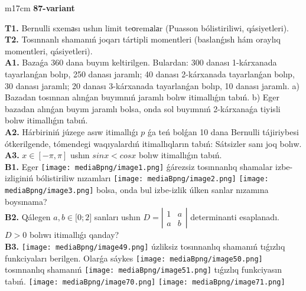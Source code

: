 \documentclass{article}
\begin{document}
\begin{tabular}{m{17cm}}
\textbf{87-variant}
\newline

\textbf{T1.} Bernulli sxemаsı ushın limit teоremаlаr (Puasson bólistiriliwi, qásiyetleri).
 \\
\textbf{T2.} Tosınnanlı shamanıń joqarı tártipli momentleri (baslanǵısh hám oraylıq momentleri, qásiyetleri).
 \\
\textbf{A1.} Bazaǵa 360 dana buyım keltirilgen. Bulardan: 300 danası 1-kárxanada tayarlanǵan bolıp, 250 danası jaramlı; 40 danası 2-kárxanada tayarlanǵan bolıp, 30 danası jaramlı; 20 danası 3-kárxanada tayarlanǵan bolıp, 10 danası jaramlı. a) Bazadan tosınnan alınǵan buyımnıń jaramlı bolıw itimallıǵın tabıń. b) Eger bazadan alınǵan buyım jaramlı bolsa, onda sol buyımnıń 2-kárxanaǵa tiyisli bolıw itimallıǵın tabıń.
 \\
\textbf{A2.} Hárbiriniń júzege asıw itimallıǵı $p$ ǵa teń bolǵan 10 dana Bernulli tájiriybesi ótkerilgende, tómendegi waqıyalardıń itimallıqların tabıń: Sátsizler sanı joq bolıw.
 \\
\textbf{A3.} $x\in \left[ -\pi ,\pi  \right]$ ushın $sinx<cosx$ bolıw itimallıǵın tabıń.
 \\
\textbf{B1.} 
Eger \texttt{[image: mediaBpng/image1.png]} ǵárezsiz tosınnanlıq shamalar izbe-izliginiń bólistiriliw nızamları
\texttt{[image: mediaBpng/image2.png]} \texttt{[image: mediaBpng/image3.png]}
bolsa, onda bul izbe-izlik úlken sanlar nızamına boysınama?
 \\
\textbf{B2.} Qálegen \(a,b \in \lbrack 0;2\rbrack\) sanları ushın \(D = \left| \begin{matrix}
1 & a \\
a & b
\end{matrix} \right|\) determinanti esaplanadı. \(D > 0\) bolıwı itimallıǵı qanday?
 \\
\textbf{B3.} \texttt{[image: mediaBpng/image49.png]} úzliksiz tosınnanlıq shamanıń tıǵızlıq funkciyaları berilgen. Olarǵa sáykes \texttt{[image: mediaBpng/image50.png]} tosınnanlıq shamanıń \texttt{[image: mediaBpng/image51.png]} tıǵızlıq funkciyasın tabıń. \texttt{[image: mediaBpng/image70.png]} \texttt{[image: mediaBpng/image71.png]}
 \\

\end{tabular}
\end{document}
